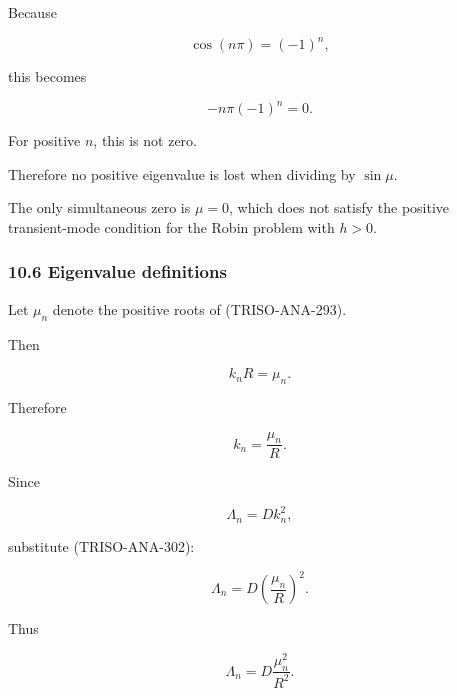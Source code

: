 \documentclass[11pt,a4paper]{article}
\begin{document}
Because

\begin{equation}
\cos(n\pi)=(-1)^n,
\tag{TRISO-ANA-299}
\label{eq:triso-ana-299}
\end{equation}

this becomes

\begin{equation}
-n\pi(-1)^n=0.
\tag{TRISO-ANA-300}
\label{eq:triso-ana-300}
\end{equation}

For positive $n$, this is not zero.

Therefore no positive eigenvalue is lost when dividing by $\sin\mu$.

The only simultaneous zero is $\mu=0$, which does not satisfy the positive transient-mode condition for the Robin problem with $h>0$.

\subsubsection*{10.6 Eigenvalue definitions}

Let $\mu_n$ denote the positive roots of (TRISO-ANA-293).

Then

\begin{equation}
k_nR=\mu_n.
\tag{TRISO-ANA-301}
\label{eq:triso-ana-301}
\end{equation}

Therefore

\begin{equation}
\boxed{
k_n=\frac{\mu_n}{R}.
}
\tag{TRISO-ANA-302}
\label{eq:triso-ana-302}
\end{equation}

Since

\begin{equation}
\Lambda_n=Dk_n^2,
\tag{TRISO-ANA-303}
\label{eq:triso-ana-303}
\end{equation}

substitute (TRISO-ANA-302):

\begin{equation}
\Lambda_n
=
D
\left(
\frac{\mu_n}{R}
\right)^2.
\tag{TRISO-ANA-304}
\label{eq:triso-ana-304}
\end{equation}

Thus

\begin{equation}
\boxed{
\Lambda_n
=
D\frac{\mu_n^2}{R^2}.
}
\tag{TRISO-ANA-305}
\label{eq:triso-ana-305}
\end{equation}
\end{document}
